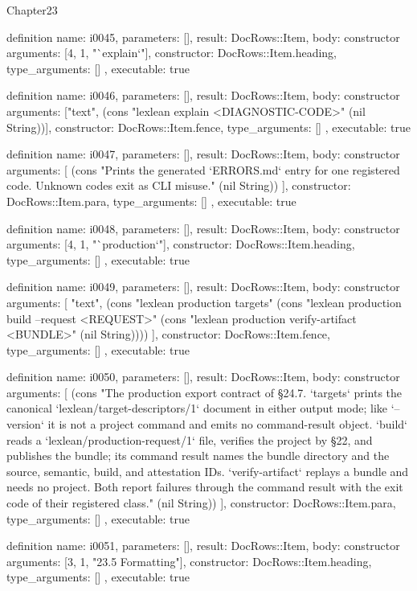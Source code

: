\begin{lexlean}{Chapter23}
\begin{semanticmodule}
definition{
  name: i0045,
  parameters: [],
  result: DocRows::Item,
  body: constructor{
    arguments: [4, 1, "`explain`"],
    constructor: DocRows::Item.heading,
    type_arguments: []
  },
  executable: true
}

definition{
  name: i0046,
  parameters: [],
  result: DocRows::Item,
  body: constructor{
    arguments: ["text", (cons "lexlean explain <DIAGNOSTIC-CODE>" (nil String))],
    constructor: DocRows::Item.fence,
    type_arguments: []
  },
  executable: true
}

definition{
  name: i0047,
  parameters: [],
  result: DocRows::Item,
  body: constructor{
    arguments: [
      (cons "Prints the generated `ERRORS.md` entry for one registered code. Unknown codes exit as CLI misuse." (nil String))
    ],
    constructor: DocRows::Item.para,
    type_arguments: []
  },
  executable: true
}

definition{
  name: i0048,
  parameters: [],
  result: DocRows::Item,
  body: constructor{
    arguments: [4, 1, "`production`"],
    constructor: DocRows::Item.heading,
    type_arguments: []
  },
  executable: true
}

definition{
  name: i0049,
  parameters: [],
  result: DocRows::Item,
  body: constructor{
    arguments: [
      "text",
      (cons "lexlean production targets" (cons "lexlean production build --request <REQUEST>" (cons "lexlean production verify-artifact <BUNDLE>" (nil String))))
    ],
    constructor: DocRows::Item.fence,
    type_arguments: []
  },
  executable: true
}

definition{
  name: i0050,
  parameters: [],
  result: DocRows::Item,
  body: constructor{
    arguments: [
      (cons "The production export contract of §24.7. `targets` prints the canonical `lexlean/target-descriptors/1` document in either output mode; like `--version` it is not a project command and emits no command-result object. `build` reads a `lexlean/production-request/1` file, verifies the project by §22, and publishes the bundle; its command result names the bundle directory and the source, semantic, build, and attestation IDs. `verify-artifact` replays a bundle and needs no project. Both report failures through the command result with the exit code of their registered class." (nil String))
    ],
    constructor: DocRows::Item.para,
    type_arguments: []
  },
  executable: true
}

definition{
  name: i0051,
  parameters: [],
  result: DocRows::Item,
  body: constructor{
    arguments: [3, 1, "23.5 Formatting"],
    constructor: DocRows::Item.heading,
    type_arguments: []
  },
  executable: true
}


\end{semanticmodule}
\end{lexlean}
